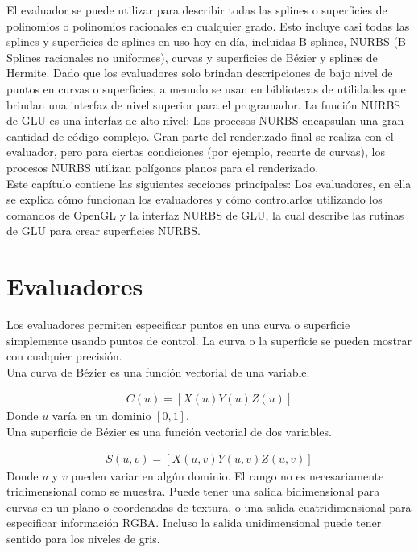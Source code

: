 El evaluador se puede utilizar para describir todas las splines o superficies de polinomios o polinomios racionales en cualquier grado. Esto incluye casi todas las splines y superficies de splines en uso hoy en día, incluidas B-splines, NURBS (B-Splines racionales no uniformes), curvas y superficies de Bézier y splines de Hermite. Dado que los evaluadores solo brindan descripciones de bajo nivel de puntos en curvas o superficies, a menudo se usan en bibliotecas de utilidades que brindan una interfaz de nivel superior para el programador. La función NURBS de GLU es una interfaz de alto nivel: Los procesos NURBS encapsulan una gran cantidad de código complejo. Gran parte del renderizado final se realiza con el evaluador, pero para ciertas condiciones (por ejemplo, recorte de curvas), los procesos NURBS utilizan polígonos planos para el renderizado.\\

Este capítulo contiene las siguientes secciones principales: Los evaluadores, en ella se explica cómo funcionan los evaluadores y cómo controlarlos utilizando los comandos de OpenGL y la interfaz NURBS de GLU, la cual describe las rutinas de GLU para crear superficies NURBS.
\section{Evaluadores}
Los evaluadores permiten especificar puntos en una curva o superficie simplemente usando puntos de control. La curva o la superficie se pueden mostrar con cualquier precisión.\\

Una curva de Bézier es una función vectorial de una variable.

\begin{align*}
C\left(u\right)=[X\left(u\right)Y\left(u\right)Z\left(u\right)]
\end{align*}
Donde $u$ varía en un dominio $[0,1]$. \\

Una superficie de Bézier es una función vectorial de dos variables.

\begin{align*}
S\left(u,v\right)=[X\left(u,v\right)Y\left(u,v\right)Z\left(u,v\right)]
\end{align*}
Donde $u$ y $v$ pueden variar en algún dominio. El rango no es necesariamente tridimensional como se muestra. Puede tener una salida bidimensional para curvas en un plano o coordenadas de textura, o una salida cuatridimensional para especificar información RGBA. Incluso la salida unidimensional puede tener sentido para los niveles de gris.\\

